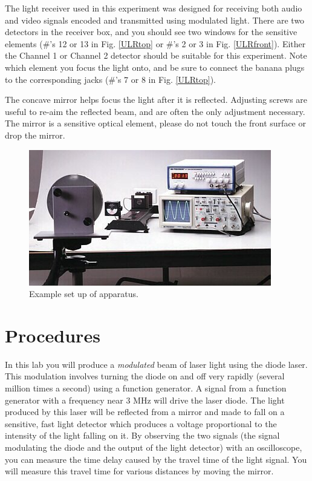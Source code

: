 \documentclass{article}
\begin{document}
The light receiver used in this experiment was designed for receiving both audio and video signals encoded and transmitted using modulated light.  There are two detectors in the receiver box, and you should see two windows for the sensitive elements (\#'s 12 or 13 in Fig. \ref{ULRtop} or \#'s 2 or 3 in Fig. \ref{ULRfront}).
Either the Channel 1 or Channel 2 detector should be suitable for this experiment.  Note which element you focus the light onto, and be sure to connect the banana plugs to the corresponding jacks (\#'s 7 or 8 in Fig. \ref{ULRtop}).   

The concave mirror helps focus the light after it is reflected.  Adjusting screws are useful to re-aim the reflected beam, and are often the only adjustment necessary.  The mirror is a sensitive optical element, please do not touch the front surface or drop the mirror.

\begin{figure}
\includegraphics{images/AP8586.jpg}
\caption{Example set up of apparatus.}
\end{figure}

\section{Procedures}

In this lab you will produce a {\em modulated} beam of laser light using the diode laser.  This modulation involves turning the diode on and off very rapidly (several million times a second) using a function generator.  A signal from a function generator with a frequency near 3 MHz will drive the laser diode.  The light produced by this laser will be reflected from a mirror and made to fall on a sensitive, fast light detector which produces a voltage proportional to the intensity of the light falling on it.  By observing the two signals (the signal modulating the diode and the output of the light detector) with an oscilloscope, you can measure the time delay caused by the travel time of the light signal.  You will measure this travel time for various distances by moving the mirror.
\end{document}
